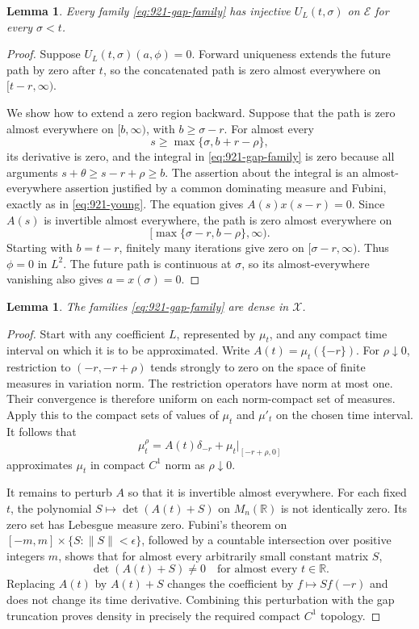 \documentclass[11pt,a4paper]{article}
\newtheorem{lemma}[theorem]{Lemma}
\theoremstyle{remark}
\begin{document}
\begin{lemma}\label{lem:921-gap-injective}
Every family \eqref{eq:921-gap-family} has injective $U_L(t,\sigma)$ on
$\mathcal E$ for every $\sigma<t$.
\end{lemma}
\begin{proof}
Suppose $U_L(t,\sigma)(a,\phi)=0$. Forward uniqueness extends the future
path by zero after $t$, so the concatenated path is zero almost everywhere
on $[t-r,\infty)$.

We show how to extend a zero region backward. Suppose that the path is
zero almost everywhere on $[b,\infty)$, with $b\ge\sigma-r$. For almost
every
\[
 s\ge\max\{\sigma,b+r-\rho\},
\]
its derivative is zero, and the integral in
\eqref{eq:921-gap-family} is zero because all arguments
$s+\theta\ge s-r+\rho\ge b$. The assertion about the integral is an
almost-everywhere assertion justified by a common dominating measure
and Fubini, exactly as in \eqref{eq:921-young}.
The equation gives $A(s)x(s-r)=0$. Since $A(s)$ is invertible almost
everywhere, the path is zero almost everywhere on
\[
 [\max\{\sigma-r,b-\rho\},\infty).
\]
Starting with $b=t-r$, finitely many iterations give zero on
$[\sigma-r,\infty)$. Thus $\phi=0$ in $L^2$. The future path is
continuous at $\sigma$, so its almost-everywhere vanishing also gives
$a=x(\sigma)=0$.
\end{proof}

\begin{lemma}\label{lem:921-density}
The families \eqref{eq:921-gap-family} are dense in $\mathcal X$.
\end{lemma}
\begin{proof}
Start with any coefficient $L$, represented by $\mu_t$, and any compact
time interval on which it is to be approximated. Write
$A(t)=\mu_t(\{-r\})$. For $\rho\downarrow0$, restriction to
$(-r,-r+\rho)$ tends strongly to zero on the space of finite measures
in variation norm. The restriction operators have norm at most one.
Their convergence is therefore uniform on each norm-compact set of
measures. Apply this to the compact sets of values of $\mu_t$ and
$\mu'_t$ on the chosen time interval. It follows that
\[
 \mu_t^{\rho}=A(t)\delta_{-r}+\mu_t|_{[-r+\rho,0]}
\]
approximates $\mu_t$ in compact $C^1$ norm as $\rho\downarrow0$.

It remains to perturb $A$ so that it is invertible almost everywhere.
For each fixed $t$, the polynomial
$S\mapsto\det(A(t)+S)$ on $M_n(\mathbb R)$ is not identically zero.
Its zero set has Lebesgue measure zero. Fubini's theorem on
$[-m,m]\times\{S:\|S\|<\epsilon\}$, followed by a countable intersection
over positive integers $m$, shows that for almost every arbitrarily
small constant matrix $S$,
\[
 \det(A(t)+S)\ne0\quad\text{for almost every }t\in\mathbb R.
\]
Replacing $A(t)$ by $A(t)+S$ changes the coefficient by
$f\mapsto Sf(-r)$ and does not change its time derivative. Combining
this perturbation with the gap truncation proves density in precisely
the required compact $C^1$ topology.
\end{proof}
\end{document}
